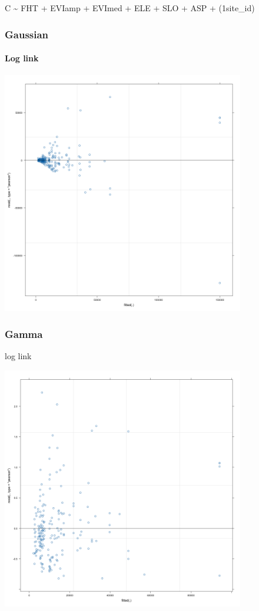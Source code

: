 \documentclass[
  letterpaper,
  DIV=11,
  numbers=noendperiod]{scrartcl}
\let\oldparagraph\paragraph
\renewcommand{\paragraph}[1]{\oldparagraph{#1}\mbox{}}
\begin{document}
C \textasciitilde{} FHT + EVIamp + EVImed + ELE + SLO + ASP +
(1\textbar site\_id)

\hypertarget{gaussian}{%
\subsubsection{Gaussian}\label{gaussian}}

\hypertarget{log-link}{%
\paragraph{Log link}\label{log-link}}

\includegraphics[width=4.16667in,height=\textheight]{residual plots for gzlm/gaussian_log.png}

\hypertarget{gamma}{%
\subsubsection{Gamma}\label{gamma}}

log link

\includegraphics[width=4.16667in,height=\textheight]{residual plots for gzlm/gamma_log.png}
\end{document}
